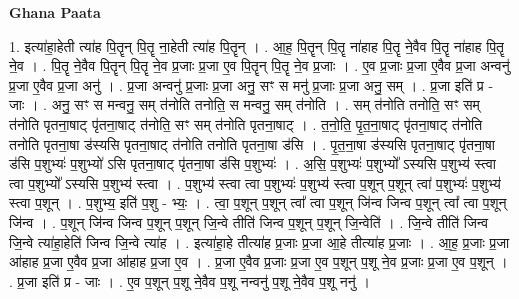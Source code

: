 \documentclass[17pt]{extarticle}
\begin{document}
\textbf{Ghana Paata } \newline

1. इत्या॑हा॒हेती त्या॑ह पि॒तॄन् पि॒तॄ ना॒हेती त्या॑ह पि॒तॄन् । . आ॒ह॒ पि॒तॄन् पि॒तॄ ना॑हाह पि॒तॄ ने॒वैव पि॒तॄ ना॑हाह पि॒तॄ ने॒व । . पि॒तॄ ने॒वैव पि॒तॄन् पि॒तॄ ने॒व प्र॒जाः प्र॒जा ए॒व पि॒तॄन् पि॒तॄ ने॒व प्र॒जाः । . ए॒व प्र॒जाः प्र॒जा ए॒वैव प्र॒जा अन्वनु॑ प्र॒जा ए॒वैव प्र॒जा अनु॑ । . प्र॒जा अन्वनु॑ प्र॒जाः प्र॒जा अनु॒ सꣳ स मनु॑ प्र॒जाः प्र॒जा अनु॒ सम् । . प्र॒जा इति॑ प्र - जाः । . अनु॒ सꣳ स मन्वनु॒ सम् त॑नोति तनोति॒ स मन्वनु॒ सम् त॑नोति । . सम् त॑नोति तनोति॒ सꣳ सम् त॑नोति पृतना॒षाट् पृ॑तना॒षाट् त॑नोति॒ सꣳ सम् त॑नोति पृतना॒षाट् । . त॒नो॒ति॒ पृ॒त॒ना॒षाट् पृ॑तना॒षाट् त॑नोति तनोति पृतना॒षा ड॑स्यसि पृतना॒षाट् त॑नोति तनोति पृतना॒षा ड॑सि । . पृ॒त॒ना॒षा ड॑स्यसि पृतना॒षाट् पृ॑तना॒षा ड॑सि प॒शुभ्यः॑ प॒शुभ्यो॑ ऽसि पृतना॒षाट् पृ॑तना॒षा ड॑सि प॒शुभ्यः॑ । . अ॒सि॒ प॒शुभ्यः॑ प॒शुभ्यो᳚ ऽस्यसि प॒शुभ्य॑ स्त्वा त्वा प॒शुभ्यो᳚ ऽस्यसि प॒शुभ्य॑ स्त्वा । . प॒शुभ्य॑ स्त्वा त्वा प॒शुभ्यः॑ प॒शुभ्य॑ स्त्वा प॒शून् प॒शून् त्वा॑ प॒शुभ्यः॑ प॒शुभ्य॑ स्त्वा प॒शून् । . प॒शुभ्य॒ इति॑ प॒शु - भ्यः॒ । . त्वा॒ प॒शून् प॒शून् त्वा᳚ त्वा प॒शून् जि॑न्व जिन्व प॒शून् त्वा᳚ त्वा प॒शून् जि॑न्व । . प॒शून् जि॑न्व जिन्व प॒शून् प॒शून् जि॒न्वे तीति॑ जिन्व प॒शून् प॒शून् जि॒न्वेति॑ । . जि॒न्वे तीति॑ जिन्व जि॒न्वे त्या॑हा॒हेति॑ जिन्व जि॒न्वे त्या॑ह । . इत्या॑हा॒हे तीत्या॑ह प्र॒जाः प्र॒जा आ॒हे तीत्या॑ह प्र॒जाः । . आ॒ह॒ प्र॒जाः प्र॒जा आ॑हाह प्र॒जा ए॒वैव प्र॒जा आ॑हाह प्र॒जा ए॒व । . प्र॒जा ए॒वैव प्र॒जाः प्र॒जा ए॒व प॒शून् प॒शू ने॒व प्र॒जाः प्र॒जा ए॒व प॒शून् । . प्र॒जा इति॑ प्र - जाः । . ए॒व प॒शून् प॒शू ने॒वैव प॒शू नन्वनु॑ प॒शू ने॒वैव प॒शू ननु॑ । \newline
\end{document}
